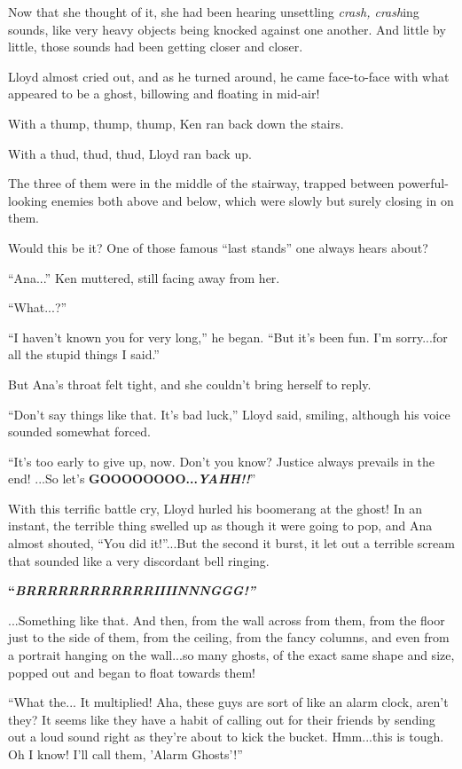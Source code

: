 \documentclass[
]{article}
\begin{document}
Now that she thought of it, she had been hearing unsettling \emph{crash,
crash}ing sounds, like very heavy objects being knocked against one
another. And little by little, those sounds had been getting closer and
closer.

Lloyd almost cried out, and as he turned around, he came face-to-face
with what appeared to be a ghost, billowing and floating in mid-air!

With a thump, thump, thump, Ken ran back down the stairs.

With a thud, thud, thud, Lloyd ran back up.

The three of them were in the middle of the stairway, trapped between
powerful-looking enemies both above and below, which were slowly but
surely closing in on them.

Would this be it? One of those famous ``last stands'' one always hears
about?

``Ana...'' Ken muttered, still facing away from her.

``What...?''

``I haven't known you for very long,'' he began. ``But it's been fun.
I'm sorry...for all the stupid things I said.''

But Ana's throat felt tight, and she couldn't bring herself to reply.

``Don't say things like that. It's bad luck,'' Lloyd said, smiling,
although his voice sounded somewhat forced.

``It's too early to give up, now. Don't you know? Justice always
prevails in the end! ...So let's\textbf{
GOOOOOOOO...}\emph{\textbf{YAHH!!}}''

With this terrific battle cry, Lloyd hurled his boomerang at the ghost!
In an instant, the terrible thing swelled up as though it were going to
pop, and Ana almost shouted, ``You did it!''...But the second it burst,
it let out a terrible scream that sounded like a very discordant bell
ringing.

\textbf{``}\emph{\textbf{BRRRRRRRRRRRRIIIINNNGGG!''}}

...Something like that. And then, from the wall across from them, from
the floor just to the side of them, from the ceiling, from the fancy
columns, and even from a portrait hanging on the wall...so many ghosts,
of the exact same shape and size, popped out and began to float towards
them!

``What the... It multiplied! Aha, these guys are sort of like an alarm
clock, aren't they? It seems like they have a habit of calling out for
their friends by sending out a loud sound right as they're about to kick
the bucket. Hmm...this is tough. Oh I know! I'll call them, 'Alarm
Ghosts'!''
\end{document}
